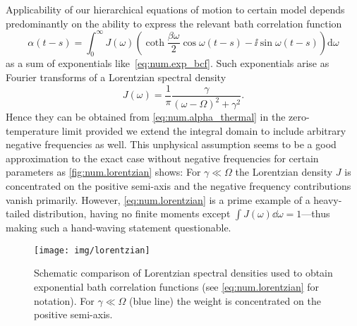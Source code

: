 
Applicability of our hierarchical equations of motion to certain model depends predominantly on the ability to express the relevant bath correlation function
\begin{equation}
  \alpha(t-s) = \int_0^\infty J(\omega) \left( \coth \frac{\beta \omega}{2} \cos \omega(t-s) - \ii\sin \omega(t-s) \right) \mathrm{d}\omega
  \label{eq:num.alpha_thermal}
\end{equation}
as a sum of exponentials like~\ref{eq:num.exp_bcf}.
Such exponentials arise as Fourier transforms of a Lorentzian spectral density
\begin{equation}
  J(\omega) = \frac{1}{\pi} \frac{\gamma}{(\omega - \Omega)^2 + \gamma^2}.
  \label{eq:num.lorentzian}
\end{equation}
Hence they can be obtained from \autoref{eq:num.alpha_thermal} in the zero-temperature limit provided we extend the integral domain to include arbitrary negative frequencies as well.
This unphysical assumption seems to be a good approximation to the exact case without negative frequencies for certain parameters as \autoref{fig:num.lorentzian} shows:
For $\gamma\ll\Omega$ the Lorentzian density $J$ is concentrated on the positive semi-axis and the negative frequency contributions vanish primarily.
However, \autoref{eq:num.lorentzian} is a prime example of a heavy-tailed distribution, having no finite moments except $\int J(\omega) \dd \omega = 1$---thus making such a hand-waving statement questionable.\\

\begin{figure}
  \centering
  \texttt{[image: img/lorentzian]}
  \caption{%
    Schematic comparison of Lorentzian spectral densities used to obtain exponential bath correlation functions (see \autoref{eq:num.lorentzian} for notation).
    For $\gamma\ll\Omega$ (blue line) the weight is concentrated on the positive semi-axis.
  }
  \label{fig:num.lorentzian}
\end{figure}

